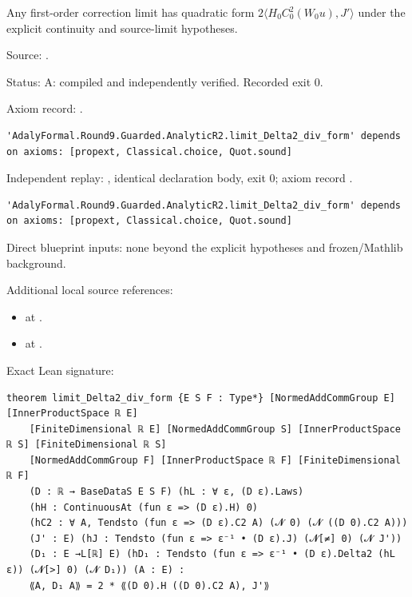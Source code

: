 \begin{theorem}[bp-094]
\label{bp-094}
\uses{}
\leanok
Any first-order correction limit has quadratic form \(2\langle H_0C^2_0(W_0u),J'\rangle\) under the explicit continuity and source-limit hypotheses.

\par Source: \texttt{}.
\par Status: A: compiled and independently verified. Recorded exit 0.
\par Axiom record: \texttt{}.
\begin{verbatim}
'AdalyFormal.Round9.Guarded.AnalyticR2.limit_Delta2_div_form' depends on axioms: [propext, Classical.choice, Quot.sound]
\end{verbatim}
\par Independent replay: \texttt{}, identical declaration body, exit 0; axiom record \texttt{}.
\begin{verbatim}
'AdalyFormal.Round9.Guarded.AnalyticR2.limit_Delta2_div_form' depends on axioms: [propext, Classical.choice, Quot.sound]
\end{verbatim}
\par Direct blueprint inputs: none beyond the explicit hypotheses and frozen/Mathlib background.
\par Additional local source references:
\begin{itemize}
\item \texttt{} at \texttt{}.
\item \texttt{} at \texttt{}.
\end{itemize}
\par Exact Lean signature:
\begin{verbatim}
theorem limit_Delta2_div_form {E S F : Type*} [NormedAddCommGroup E] [InnerProductSpace ℝ E]
    [FiniteDimensional ℝ E] [NormedAddCommGroup S] [InnerProductSpace ℝ S] [FiniteDimensional ℝ S]
    [NormedAddCommGroup F] [InnerProductSpace ℝ F] [FiniteDimensional ℝ F]
    (D : ℝ → BaseDataS E S F) (hL : ∀ ε, (D ε).Laws)
    (hH : ContinuousAt (fun ε => (D ε).H) 0)
    (hC2 : ∀ A, Tendsto (fun ε => (D ε).C2 A) (𝓝 0) (𝓝 ((D 0).C2 A)))
    (J' : E) (hJ : Tendsto (fun ε => ε⁻¹ • (D ε).J) (𝓝[≠] 0) (𝓝 J'))
    (D₁ : E →L[ℝ] E) (hD₁ : Tendsto (fun ε => ε⁻¹ • (D ε).Delta2 (hL ε)) (𝓝[>] 0) (𝓝 D₁)) (A : E) :
    ⟪A, D₁ A⟫ = 2 * ⟪(D 0).H ((D 0).C2 A), J'⟫
\end{verbatim}
\end{theorem}

